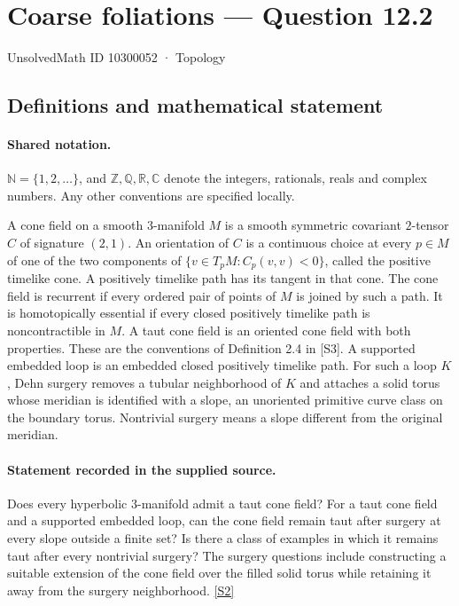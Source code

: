 \documentclass[11pt]{article}
\newcommand{\sref}[2]{\hyperlink{source:#1:#2}{[S#2]}}
\begin{document}
\setcounter{section}{10300051}
\section{Coarse foliations — Question 12.2}\label{10300052}
{\small\sffamily UnsolvedMath ID 10300052 · Topology}
\subsection{Definitions and mathematical statement}

\paragraph{Shared notation.}$\mathbb N=\{1,2,\ldots\}$, and $\mathbb Z,\mathbb Q,\mathbb R,\mathbb C$ denote the integers, rationals, reals and complex numbers. Any other conventions are specified locally.


A cone field on a smooth $3$-manifold $M$ is a smooth symmetric covariant $2$-tensor $C$ of signature $(2,1)$. An orientation of $C$ is a continuous choice at every $p\in M$ of one of the two components of $\{v\in T_pM:C_p(v,v)<0\}$, called the positive timelike cone. A positively timelike path has its tangent in that cone. The cone field is recurrent if every ordered pair of points of $M$ is joined by such a path. It is homotopically essential if every closed positively timelike path is noncontractible in $M$. A taut cone field is an oriented cone field with both properties. These are the conventions of Definition 2.4 in [S3]. A supported embedded loop is an embedded closed positively timelike path. For such a loop $K$, Dehn surgery removes a tubular neighborhood of $K$ and attaches a solid torus whose meridian is identified with a slope, an unoriented primitive curve class on the boundary torus. Nontrivial surgery means a slope different from the original meridian.
\paragraph{Statement recorded in the supplied source.}
Does every hyperbolic $3$-manifold admit a taut cone field? For a taut cone field and a supported embedded loop, can the cone field remain taut after surgery at every slope outside a finite set? Is there a class of examples in which it remains taut after every nontrivial surgery? The surgery questions include constructing a suitable extension of the cone field over the filled solid torus while retaining it away from the surgery neighborhood. \sref{10300052}{2}
\end{document}
